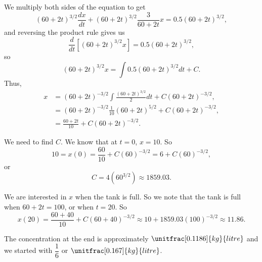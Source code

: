 {

We multiply both sides of the equation to get
\[
{(60+2t)}^{3/2} \frac{dx}{dt} +
{(60+2t)}^{3/2} \frac{3}{60+2t} x
 =
0.5{(60+2t)}^{3/2} ,
\]
and reversing the product rule gives us
\[
\frac{d}{dt}\left[
{(60+2t)}^{3/2} x \right]
 =
0.5{(60+2t)}^{3/2} ,
\]
so
\[
{(60+2t)}^{3/2} x
 =
\int 
0.5{(60+2t)}^{3/2}
dt
+C.
\]
Thus,
\begin{align*}
 x
& =
{(60+2t)}^{-3/2} \int 
\frac{
{(60+2t)}^{3/2}
}{2}
dt
+C{(60+2t)}^{-3/2} ,\\
& =
{(60+2t)}^{-3/2}
\frac{1}{10}{(60+2t)}^{5/2}
+C{(60+2t)}^{-3/2} ,\\
& =
\frac{60+2t}{10}
+C{(60+2t)}^{-3/2} .
\end{align*}

We need to find $C$.  We know that at $t=0$, $x=10$.  So
\begin{equation*}
10 = x(0)
=
\frac{60}{10}
+C{(60)}^{-3/2}
=
6
+C{(60)}^{-3/2} ,
\end{equation*}
or
\begin{equation*}
C=4 ({60}^{3/2}) \approx 1859.03 .
\end{equation*}

We are interested in $x$ when the tank is full.  So we note that the tank is
full when $60+2t = 100$, or when $t=20$.  So
\begin{equation*}
x(20)= 
\frac{60+40}{10}
+C{(60+40)}^{-3/2}
\approx
10
+1859.03 {(100)}^{-3/2}
\approx
11.86 .
\end{equation*}

The concentration at the end is approximately $\unitfrac[0.1186]{kg}{litre}$ and we started
with $\dfrac{1}{6}$ or $\unitfrac[0.167]{kg}{litre}$.
}



